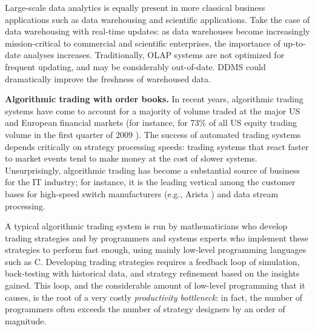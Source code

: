 Large-scale data analytics is equally present in more classical business
applications such as data warehousing and scientific applications. Take the
case of data warehousing with real-time updates: as data warehouses become
increasingly mission-critical to commercial and scientific enterprises, the
importance of up-to-date analyses increases. Traditionally, OLAP systems are not
optimized for frequent updating, and may be considerably out-of-date. DDMS could
dramatically improve the freshness of warehoused data.


\medskip


{\bf Algorithmic trading with order books.}\/
In recent years, algorithmic trading systems have come to account for a majority
of volume traded at the major US and European financial markets (for instance,
for 73\% of all US equity trading volume in the first quarter of 2009
\cite{Iati2009}). The success of automated trading systems depends critically on
strategy processing speeds: trading systems that react faster to market events
tend to make money at the cost of slower systems. Unsurprisingly, algorithmic
trading has become a substantial source of business for the IT industry; for
instance, it is the leading vertical among the customer bases for high-speed
switch manufacturers (e.g., Arista \cite{Becht2010}) and data stream processing.




A typical algorithmic trading system is run by mathematicians who develop
trading strategies and by programmers and systems experts who implement these
strategies to perform fast enough, using mainly low-level programming languages
such as C. Developing trading strategies requires a feedback loop of simulation,
back-testing with historical data, and strategy refinement based on the insights
gained. This loop, and the considerable amount of low-level programming that it
causes, is the root of a very costly {\em productivity bottleneck}\/: in fact,
the number of programmers often exceeds the number of strategy designers by
an order of magnitude.



